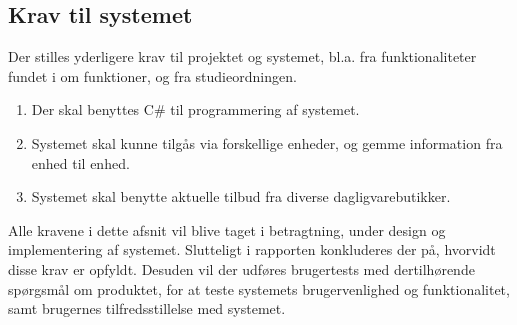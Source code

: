 \subsection{Krav til systemet}

Der stilles yderligere krav til projektet og systemet, bl.a. fra funktionaliteter fundet i  om funktioner, og fra studieordningen.
\begin{enumerate}
\item Der skal benyttes C\# til programmering af systemet.
\item Systemet skal kunne tilgås via forskellige enheder, og gemme information fra enhed til enhed.
\item Systemet skal benytte aktuelle tilbud fra diverse dagligvarebutikker.
\end{enumerate}

Alle kravene i dette afsnit vil blive taget i betragtning, under design og implementering af systemet.
Slutteligt i rapporten konkluderes der på, hvorvidt disse krav er opfyldt.
Desuden vil der udføres brugertests med dertilhørende spørgsmål om produktet, for at teste systemets brugervenlighed og funktionalitet, samt brugernes tilfredsstillelse med systemet.
